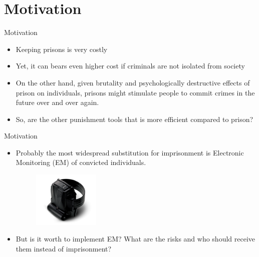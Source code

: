 \documentclass{beamer}
\begin{document}
\section{Motivation}
\begin{frame}{Motivation}
    \begin{itemize}
        \item Keeping prisons is very costly
        \item Yet, it can bears even higher cost if criminals are not isolated from society
        \item On the other hand, given brutality and psychologically destructive effects of prison on individuals, prisons might stimulate people to commit crimes in the future over and over again.
        \item So, are the other punishment tools that is more efficient compared to prison?
    \end{itemize}
\end{frame}
\begin{frame}{Motivation}
    \begin{itemize}
        \item Probably the most widespread substitution for imprisonment is Electronic Monitoring (EM) of convicted individuals.
\begin{figure}        
\centering
\includegraphics[width=0.3\textwidth]{EM.jpg}
\end{figure}

\item But is it worth to implement EM? What are the risks and who should receive them instead of imprisonment?
\end{itemize}
\end{frame}
\end{document}
